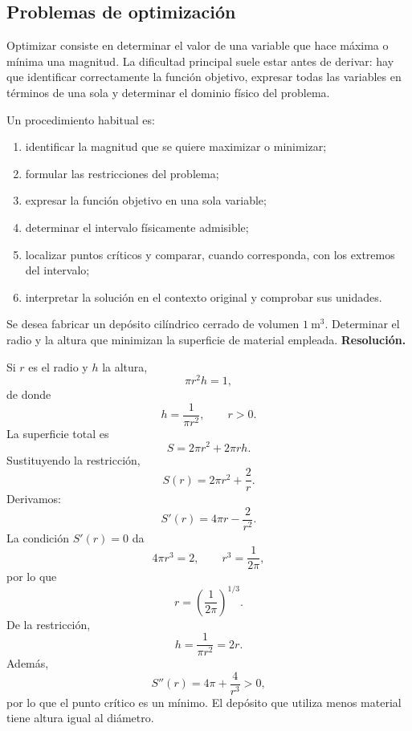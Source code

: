 \subsection{Problemas de optimización}

Optimizar consiste en determinar el valor de una variable que hace máxima o mínima una magnitud. La dificultad principal suele estar antes de derivar: hay que identificar correctamente la función objetivo, expresar todas las variables en términos de una sola y determinar el dominio físico del problema.

Un procedimiento habitual es:
\begin{enumerate}
\item identificar la magnitud que se quiere maximizar o minimizar;
\item formular las restricciones del problema;
\item expresar la función objetivo en una sola variable;
\item determinar el intervalo físicamente admisible;
\item localizar puntos críticos y comparar, cuando corresponda, con los extremos del intervalo;
\item interpretar la solución en el contexto original y comprobar sus unidades.
\end{enumerate}

\begin{solvedexercise}
Se desea fabricar un depósito cilíndrico cerrado de volumen $1\ \mathrm{m}^3$. Determinar el radio y la altura que minimizan la superficie de material empleada.
\tcblower
\textbf{Resolución.}\par\smallskip
Si $r$ es el radio y $h$ la altura,
\[
\pi r^2h=1,
\]
de donde
\[
h=\frac{1}{\pi r^2},
\qquad r>0.
\]
La superficie total es
\[
S=2\pi r^2+2\pi rh.
\]
Sustituyendo la restricción,
\[
S(r)=2\pi r^2+\frac{2}{r}.
\]
Derivamos:
\[
S'(r)=4\pi r-\frac{2}{r^2}.
\]
La condición $S'(r)=0$ da
\[
4\pi r^3=2,
\qquad
r^3=\frac{1}{2\pi},
\]
por lo que
\[
\boxed{r=\left(\frac{1}{2\pi}\right)^{1/3}}.
\]
De la restricción,
\[
h=\frac{1}{\pi r^2}=2r.
\]
Además,
\[
S''(r)=4\pi+\frac{4}{r^3}>0,
\]
por lo que el punto crítico es un mínimo. El depósito que utiliza menos material tiene altura igual al diámetro.
\end{solvedexercise}

